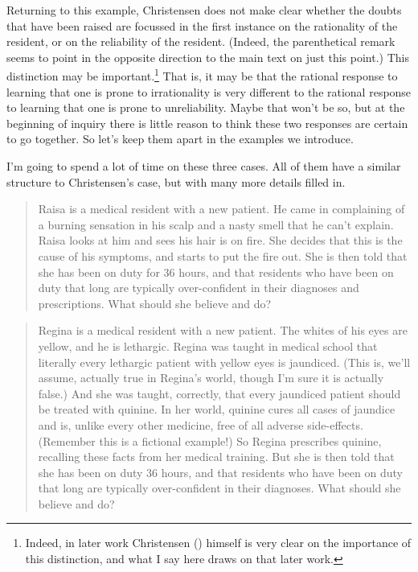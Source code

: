 \documentclass[
  10pt,
  letterpaper,
  twoside]{scrbook}
\begin{document}
Returning to this example, Christensen does not make clear whether the
doubts that have been raised are focussed in the first instance on the
rationality of the resident, or on the reliability of the resident.
(Indeed, the parenthetical remark seems to point in the opposite
direction to the main text on just this point.) This distinction may be
important.\footnote{Indeed, in later work Christensen
  () himself is very clear on the
  importance of this distinction, and what I say here draws on that
  later work.} That is, it may be that the rational response to learning
that one is prone to irrationality is very different to the rational
response to learning that one is prone to unreliability. Maybe that
won't be so, but at the beginning of inquiry there is little reason to
think these two responses are certain to go together. So let's keep them
apart in the examples we introduce.

I'm going to spend a lot of time on these three cases. All of them have
a similar structure to Christensen's case, but with many more details
filled in.

\begin{quote}
{Raisa} is a medical resident with a new patient. He came in complaining
of a burning sensation in his scalp and a nasty smell that he can't
explain. {Raisa} looks at him and sees his hair is on fire. She decides
that this is the cause of his symptoms, and starts to put the fire out.
She is then told that she has been on duty for 36 hours, and that
residents who have been on duty that long are typically over-confident
in their diagnoses and prescriptions. What should she believe and do?
\end{quote}

\begin{quote}
{Regina} is a medical resident with a new patient. The whites of his
eyes are yellow, and he is lethargic. {Regina} was taught in medical
school that literally every lethargic patient with yellow eyes is
jaundiced. (This is, we'll assume, actually true in Regina's world,
though I'm sure it is actually false.) And she was taught, correctly,
that every jaundiced patient should be treated with quinine. In her
world, quinine cures all cases of jaundice and is, unlike every other
medicine, free of all adverse side-effects. (Remember this is a
fictional example!) So {Regina} prescribes quinine, recalling these
facts from her medical training. But she is then told that she has been
on duty 36 hours, and that residents who have been on duty that long are
typically over-confident in their diagnoses. What should she believe and
do?
\end{quote}
\end{document}
